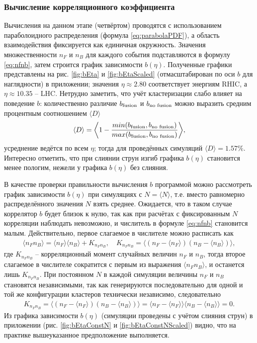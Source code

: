 \subsubsection{Вычисление корреляционного коэффициента}
Вычисления на данном этапе (четвёртом) проводятся с использованием параболоидного распределения (формула \ref{eq:parabolaPDF}), а область взаимодействия фиксируется как единичная окружность. Значения множественности $n_F$ и $n_B$ для каждого события подставляются в формулу \ref{eq:nfnb}, затем строится график зависимости $b(\eta)$. Полученные графики представлены на рис. \ref{fig:bEta} и \ref{fig:bEtaScaled} (отмасштабирован по оси $b$ для наглядности) в приложении; значения $\eta \approx 2.80$ соответствует энергиям RHIC, а $\eta \approx 10.35$ -- LHC. Нетрудно заметить, что учёт кластеризации слабо влияет на поведение $b$: количественно различие $b_{\textnormal{fusion}}$ и $b_{\textnormal{no fusion}}$ можно выразить средним процентным соотношением $\langle D \rangle$ 
\begin{equation} \label{eq:bfbn}
	\langle D \rangle = \bigg \langle 1 - \frac{min(b_{\textnormal{fusion}}, b_{\textnormal{no fusion}})}{max(b_{\textnormal{fusion}}, b_{\textnormal{no fusion}})} \bigg \rangle,
\end{equation}
усреднение ведётся по всем $\eta$; тогда для проведённых симуляций $\langle D \rangle = 1.57 \%$. Интересно отметить, что при слиянии струн изгиб графика $b(\eta)$ становится менее пологим, нежели у графика $b(\eta)$ без слияния.

В качестве проверки правильности вычисления $b$ программой можно рассмотреть график зависимости $b(\eta)$ при симуляциях с $N = \langle N \rangle$, т.е. вместо равномерно распределённого значения $N$ взять среднее. Ожидается, что в таком случае коррелятор $b$ будет близок к нулю, так как при расчётах с фиксированным $N$ корреляции наблюдать невозможно, и числитель в формуле \ref{eq:nfnb} становится малым. Действительно, первое слагаемое в числителе можно расписать как
\begin{align*}
	\langle n_F n_B \rangle = \langle n_F \rangle \langle n_B \rangle + K_{n_F n_B}, \quad K_{n_F n_B} = \langle (n_F - \langle n_F \rangle)(n_B - \langle n_B \rangle) \rangle,
\end{align*}
где $K_{n_F n_B}$ -- корреляционный момент случайных величин $n_F$ и $n_B$, тогда второе слагаемое в числителе сократится с первым из выражения $\langle n_F n_B \rangle$, и останется лишь $K_{n_F n_B}$. При постоянном $N$ в каждой симуляции величины $n_F$ и $n_B$ становятся независимыми, так как генерируются последовательно для одной и той же конфигурации кластеров технически независимо, следовательно
\begin{align*}
	K_{n_F n_B} = \langle (n_F - \langle n_F \rangle)(n_B - \langle n_B \rangle) \rangle = \langle n_F - \langle n_F \rangle \rangle \langle n_B - \langle n_B \rangle \rangle = 0.
\end{align*}
Из графика зависимости $b(\eta)$ (симуляции проведены с учётом слияния струн) в приложении (рис. \ref{fig:bEtaConstN} и \ref{fig:bEtaConstNScaled}) видно, что на практике вышеуказанное предположение выполняется.

